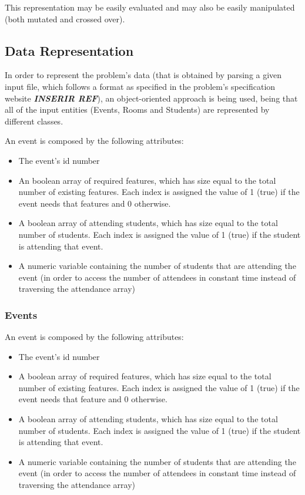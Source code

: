 \documentclass[conference]{IEEEtran}
\begin{document}
This representation may be easily evaluated and may also be easily manipulated (both mutated and crossed over).

\subsection{Data Representation}

In order to represent the problem's data (that is obtained by parsing a given input file, which follows a format as specified in the problem's specification website \textbf{\textit{INSERIR REF}}), an object-oriented approach is being used, being that all of the input entities (Events, Rooms and Students) are represented by different classes.

An event is composed by the following attributes:
\begin{itemize}
    \item The event's id number
    \item An boolean array of required features, which has size equal to the total number of existing features. Each index is assigned the value of 1 (true) if the event needs that features and 0 otherwise.
    \item A boolean array of attending students, which has size equal to the total number of students. Each index is assigned the value of 1 (true) if the student is attending that event.
    \item A numeric variable containing the number of students that are attending the event (in order to access the number of attendees in constant time instead of traversing the attendance array)
\end{itemize}

\subsubsection{Events}

An event is composed by the following attributes:
\begin{itemize}
    \item The event's id number
    \item A boolean array of required features, which has size equal to the total number of existing features. Each index is assigned the value of 1 (true) if the event needs that feature and 0 otherwise.
    \item A boolean array of attending students, which has size equal to the total number of students. Each index is assigned the value of 1 (true) if the student is attending that event.
    \item A numeric variable containing the number of students that are attending the event (in order to access the number of attendees in constant time instead of traversing the attendance array)
\end{itemize}
\end{document}
